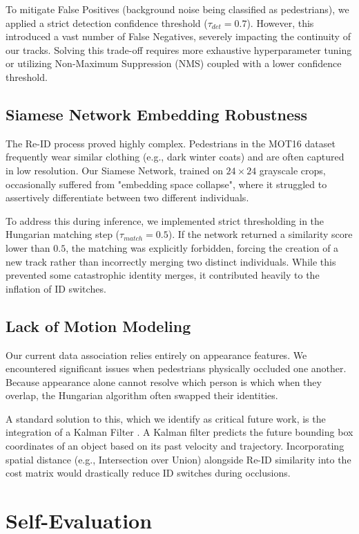\documentclass[11pt, letterpaper]{article}
\begin{document}
To mitigate False Positives (background noise being classified as pedestrians), we applied a strict detection confidence threshold ($\tau_{det} = 0.7$). However, this introduced a vast number of False Negatives, severely impacting the continuity of our tracks. Solving this trade-off requires more exhaustive hyperparameter tuning or utilizing Non-Maximum Suppression (NMS) coupled with a lower confidence threshold.

\subsection{Siamese Network Embedding Robustness}
The Re-ID process proved highly complex. Pedestrians in the MOT16 dataset frequently wear similar clothing (e.g., dark winter coats) and are often captured in low resolution. Our Siamese Network, trained on $24 \times 24$ grayscale crops, occasionally suffered from "embedding space collapse", where it struggled to assertively differentiate between two different individuals. 

To address this during inference, we implemented strict thresholding in the Hungarian matching step ($\tau_{match} = 0.5$). If the network returned a similarity score lower than $0.5$, the matching was explicitly forbidden, forcing the creation of a new track rather than incorrectly merging two distinct individuals. While this prevented some catastrophic identity merges, it contributed heavily to the inflation of ID switches.

\subsection{Lack of Motion Modeling}
Our current data association relies entirely on appearance features. We encountered significant issues when pedestrians physically occluded one another. Because appearance alone cannot resolve which person is which when they overlap, the Hungarian algorithm often swapped their identities. 

A standard solution to this, which we identify as critical future work, is the integration of a Kalman Filter \cite{kalman1960new}. A Kalman filter predicts the future bounding box coordinates of an object based on its past velocity and trajectory. Incorporating spatial distance (e.g., Intersection over Union) alongside Re-ID similarity into the cost matrix would drastically reduce ID switches during occlusions.

\section{Self-Evaluation}
\end{document}
